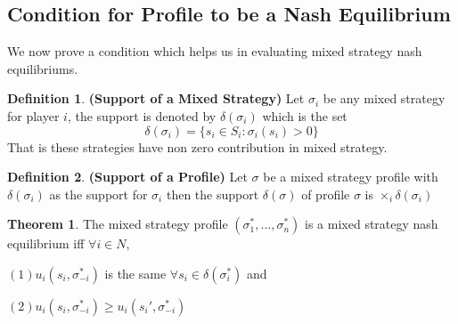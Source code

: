 \documentclass{article}
\theoremstyle{definition}
\newtheorem{theorem}{Theorem}[section]
\newtheorem{defn}{Definition}[section]
\begin{document}
\subsection{Condition for Profile to be a Nash Equilibrium}
We now prove a condition which helps us in evaluating mixed strategy nash equilibriums.
\begin{defn}
\textbf{(Support of a Mixed Strategy)} Let $\sigma_i$ be any mixed strategy for player $i$, the support is denoted by $\delta(\sigma_i)$ which is the set $$\delta(\sigma_i) = \{s_i\in S_i:\sigma_i(s_i)>0\}$$That is these strategies have non zero contribution in mixed strategy.
\end{defn}
\begin{defn}
\textbf{(Support of a Profile)} Let $\sigma$ be a mixed strategy profile with $\delta(\sigma_i)$ as the support for $\sigma_i$ then the support $\delta(\sigma)$ of profile $\sigma$ is $\times_i \delta(\sigma_i)$
\end{defn}
\begin{theorem}
\label{conditions}
The mixed strategy profile $(\sigma_1^*, \dots, \sigma_n^*)$ is a mixed strategy nash equilibrium iff $\forall i\in N$,

$(1) u_i(s_i, \sigma_{-i}^*)$ is the same $\forall s_i\in\delta(\sigma_i^*)$ and 

$(2) u_i(s_i, \sigma_{-i}^*) \geq u_i(s_i', \sigma_{-i}^*)$
\end{theorem}
\end{document}
